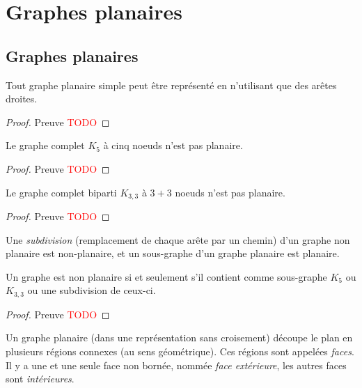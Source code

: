 \section{Graphes planaires}



\subsection{Graphes planaires}
\begin{mytheo} [Fáry]
  Tout graphe planaire simple peut être représenté en n'utilisant que des arêtes droites.
  \begin{proof}
    Preuve \textcolor{red}{TODO}
  \end{proof}
\end{mytheo}

\begin{mytheo}
  Le graphe complet $K_5$ à cinq noeuds n'est pas planaire.
  \begin{proof}
    Preuve \textcolor{red}{TODO}
  \end{proof}
\end{mytheo}

\begin{mytheo}
  Le graphe complet biparti $K_{3,3}$ à $3 + 3$ noeuds n'est pas planaire.
  \begin{proof}
    Preuve \textcolor{red}{TODO}
  \end{proof}
\end{mytheo}

\begin{mydef}
  Une \emph{subdivision} (remplacement de chaque arête par un chemin) d'un graphe non planaire est non-planaire, et un sous-graphe d'un graphe planaire est planaire.
\end{mydef}

\begin{mytheo} [Kuratowski]
  Un graphe est non planaire si et seulement s'il contient comme sous-graphe $K_5$ ou $K_{3,3}$ ou une subdivision de ceux-ci.
  \begin{proof}
    Preuve \textcolor{red}{TODO}
  \end{proof}
\end{mytheo}

\begin{mydef}
  Un graphe planaire (dans une représentation sans croisement) découpe le plan en plusieurs régions connexes (au sens géométrique). Ces régions sont appelées \emph{faces}. Il y a une et une seule face non bornée, nommée \emph{face extérieure}, les autres faces sont \emph{intérieures}.
\end{mydef}

